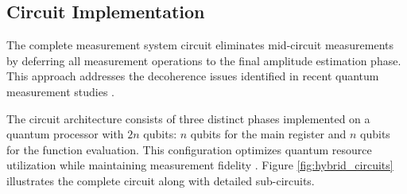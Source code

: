 \documentclass[journal]{IEEEtran}
\begin{document}
\subsection{Circuit Implementation}

The complete measurement system circuit eliminates mid-circuit measurements by deferring all measurement operations to the final amplitude estimation phase. This approach addresses the decoherence issues identified in recent quantum measurement studies \cite{robertson2025simonsperiodfindingquantum, schwetz2024simonalgorithmmeasurementbasedquantum}.

The circuit architecture consists of three distinct phases implemented on a quantum processor with $2n$ qubits: $n$ qubits for the main register and $n$ qubits for the function evaluation. This configuration optimizes quantum resource utilization while maintaining measurement fidelity \cite{sünkel2025quantumcircuitconstructionoptimization}. Figure \ref{fig:hybrid_circuits} illustrates the complete circuit along with detailed sub-circuits.
\end{document}
